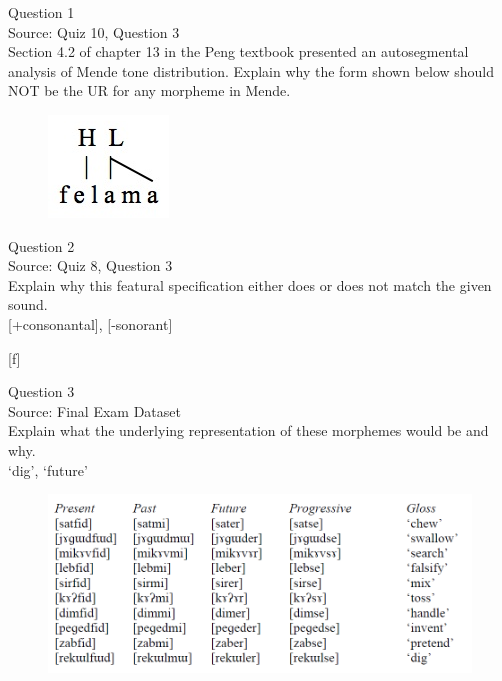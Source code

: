 \documentclass[12pt]{article}
\begin{document}
{\large Question 1}\\

Source: Quiz 10, Question 3\\

Section 4.2 of chapter 13 in the Peng textbook presented an autosegmental analysis of Mende tone distribution. Explain why the form shown below should NOT be the UR for any morpheme in Mende.\\

\begin{figure}[H]
\includegraphics{../images/mende_junction_d.png}
\end{figure}

\newpage

{\large Question 2}\\

Source: Quiz 8, Question 3\\

Explain why this featural specification either does or does not match the given sound.\\

{[+consonantal]}, {[-sonorant]}

{[f]}


\newpage

{\large Question 3}\\

Source: Final Exam Dataset\\

Explain what the underlying representation of these morphemes would be and why.\\

`dig', `future'

\begin{figure}[H]
\includegraphics{../images/final_dataset.png}
\end{figure}
\end{document}
